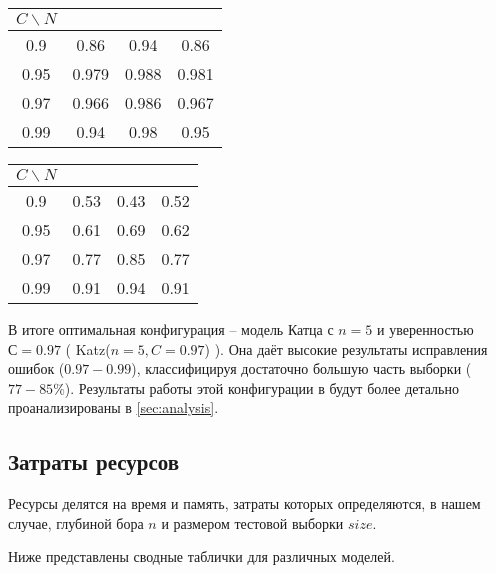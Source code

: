 \begin{multicols}{2}
	\begin{tabular}{|c|c|c|c|}\hline
		$C \backslash N$ & \KG & \BS & \MX \\ \hline
		0.9 & 0.86 & 0.94 & 0.86 \\
		0.95 & 0.979 & 0.988 & 0.981 \\
		0.97 & 0.966  & 0.986 & 0.967  \\
		0.99 & 0.94 & 0.98 & 0.95 \\ \hline 	
	\end{tabular}

	\begin{tabular}{|c|c|c|c|}\hline
		$C \backslash N$ & \KG & \BS & \MX \\ \hline
		0.9 & 0.53 & 0.43 & 0.52 \\
		0.95 & 0.61 & 0.69 & 0.62 \\
		0.97 & 0.77 & 0.85  & 0.77  \\
		0.99 & 0.91 & 0.94 & 0.91 \\ \hline 	
	\end{tabular}
\end{multicols}

\vspace{20pt}

В итоге оптимальная конфигурация -- модель Катца с $n=5$ и уверенностью $С=0.97$ ( Katz($n=5, C=0.97$) ). Она даёт высокие результаты исправления ошибок ($0.97-0.99$), классифицируя достаточно большую часть выборки ($77-85 \%$). Результаты работы этой конфигурации в будут более детально проанализированы в \cref{sec:analysis}.

\subsection{ Затраты ресурсов }

Ресурсы делятся на время и память, затраты которых определяются, в нашем случае, глубиной бора $n$ и размером тестовой выборки $size$.

Ниже представлены сводные таблички для различных моделей.

